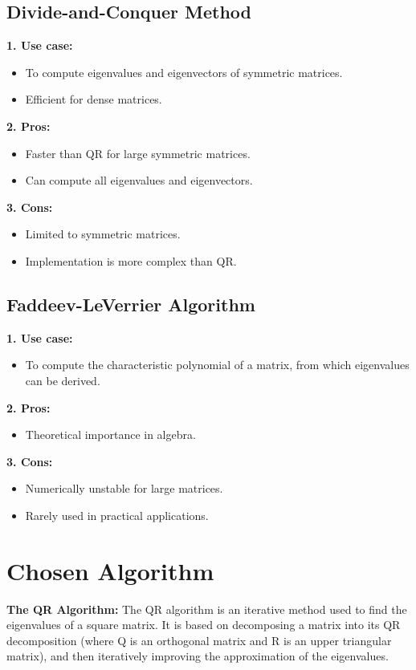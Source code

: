 \documentclass{article}
\begin{document}
\subsection{Divide-and-Conquer Method}
\textbf{1. Use case:}
\begin{itemize}
    \item To compute eigenvalues and eigenvectors of symmetric matrices.
    \item Efficient for dense matrices.
\end{itemize}
\textbf{2. Pros:}
\begin{itemize}
    \item Faster than QR for large symmetric matrices.
    \item Can compute all eigenvalues and eigenvectors. 
\end{itemize}
\textbf{3. Cons:}
\begin{itemize}
    \item Limited to symmetric matrices.
    \item Implementation is more complex than QR.
\end{itemize}
\subsection{Faddeev-LeVerrier Algorithm}
\textbf{1. Use case:}
\begin{itemize}
    \item To compute the characteristic polynomial of a matrix, from which eigenvalues can be derived.
\end{itemize}
\textbf{2. Pros:}
\begin{itemize}
    \item Theoretical importance in algebra.
\end{itemize}
\textbf{3. Cons:}
\begin{itemize}
    \item Numerically unstable for large matrices.
    \item Rarely used in practical applications.
\end{itemize}
\section{Chosen Algorithm}
\textbf{The QR Algorithm:}
The QR algorithm is an iterative method used to find the eigenvalues of a square matrix. It is based on decomposing a matrix into its QR decomposition (where Q is an orthogonal matrix and R is an upper triangular matrix), and then iteratively improving the approximation of the eigenvalues.
\end{document}
